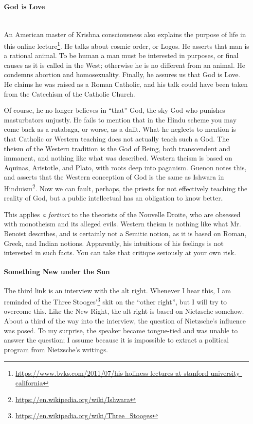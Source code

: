 \paragraph{God is Love}


{}\strut \\

An American master of Krishna consciousness also explains the purpose of life in this online lecture\footnote{\url{https://www.bvks.com/2011/07/his-holiness-lectures-at-stanford-university-california}}. He talks about cosmic order, or Logos. He asserts that man is a rational animal. To be human a man must be interested in purposes, or final causes as it is called in the West; otherwise he is no different from an animal. He condemns abortion and homosexuality. Finally, he assures us that God is Love. He claims he was raised as a Roman Catholic, and his talk could have been taken from the Catechism of the Catholic Church.

Of course, he no longer believes in ``that'' God, the sky God who punishes masturbators unjustly. He fails to mention that in the Hindu scheme you may come back as a rutabaga, or worse, as a dalit. What he neglects to mention is that Catholic or Western teaching does not actually teach such a God. The theism of the Western tradition is the God of Being, both transcendent and immanent, and nothing like what was described. Western theism is based on Aquinas, Aristotle, and Plato, with roots deep into paganism. Guenon notes this, and asserts that the Western conception of God is the same as Ishwara in Hinduism\footnote{\url{https://en.wikipedia.org/wiki/Ishwara}}. Now we can fault, perhaps, the priests for not effectively teaching the reality of God, but a public intellectual has an obligation to know better.

This applies \emph{a fortiori} to the theorists of the Nouvelle Droite, who are obsessed with monotheism and its alleged evils. Western theism is nothing like what Mr. Benoist describes, and is certainly not a Semitic notion, as it is based on Roman, Greek, and Indian notions. Apparently, his intuitions of his feelings is not interested in such facts. You can take that critique seriously at your own risk.

\paragraph{Something New under the Sun}


The third link is an interview with the alt right. Whenever I hear this, I am reminded of the Three Stooges'\footnote{\url{https://en.wikipedia.org/wiki/Three_Stooges}} skit on the ``other right'', but I will try to overcome this. Like the New Right, the alt right is based on Nietzsche somehow. About a third of the way into the interview, the question of Nietzsche's influence was posed. To my surprise, the speaker became tongue-tied and was unable to answer the question; I assume because it is impossible to extract a political program from Nietzsche's writings.

